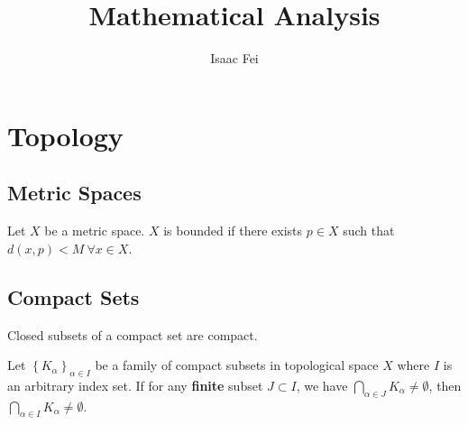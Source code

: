 \documentclass[thmcnt=section, 12pt]{elegantbook}
\title{Mathematical Analysis}
\author{Isaac Fei}
\begin{document}
\maketitle

\frontmatter
\tableofcontents
\mainmatter



\chapter{Topology}


\section{Metric Spaces}


\begin{definition}
    Let $X$ be a metric space. $X$ is bounded if there exists $p \in X$ such that $d(x, p) < M \ \forall x \in X$.
\end{definition}


\section{Compact Sets}


\begin{theorem} \label{thm:9}
    Closed subsets of a compact set are compact.
\end{theorem}


\begin{theorem} \label{thm:10}
    Let $\left\{K_\alpha\right\}_{\alpha \in I}$ be a family of compact subsets in topological space $X$ where $I$ is an arbitrary index set. If for any \textbf{finite} subset $J \subset I$, we have $\bigcap_{\alpha \in J} K_\alpha \neq \emptyset$, then $\bigcap_{\alpha \in I} K_\alpha \neq \emptyset$.
\end{theorem}

\end{document}
